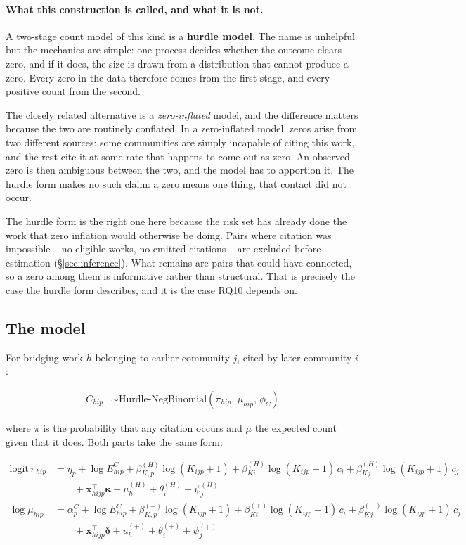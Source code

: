 \documentclass[11pt]{article}
\begin{document}
\paragraph{What this construction is called, and what it is not.} A two-stage count model of
this kind is a \textbf{hurdle model}. The name is unhelpful but the mechanics are simple: one
process decides whether the outcome clears zero, and if it does, the size is drawn from a
distribution that cannot produce a zero. Every zero in the data therefore comes from the
first stage, and every positive count from the second.

The closely related alternative is a \emph{zero-inflated} model, and the difference matters
because the two are routinely conflated. In a zero-inflated model, zeros arise from two
different sources: some communities are simply incapable of citing this work, and the rest
cite it at some rate that happens to come out as zero. An observed zero is then ambiguous
between the two, and the model has to apportion it. The hurdle form makes no such claim: a
zero means one thing, that contact did not occur.

The hurdle form is the right one here because the risk set has already done the work that
zero inflation would otherwise be doing. Pairs where citation was impossible -- no eligible
works, no emitted citations -- are excluded before estimation (\S\ref{sec:inference}). What
remains are pairs that could have connected, so a zero among them is informative rather than
structural. That is precisely the case the hurdle form describes, and it is the case RQ10
depends on.

\subsection{The model}

For bridging work $h$ belonging to earlier community $j$, cited by later community $i$:

\begin{align}
C_{hip} &\sim \mathrm{Hurdle\text{-}NegBinomial}\!\left(\pi_{hip},\, \mu_{hip},\, \phi_C\right)
\end{align}

where $\pi$ is the probability that any citation occurs and $\mu$ the expected count given
that it does. Both parts take the same form:

\begin{align}
\mathrm{logit}\,\pi_{hip} &= \eta_p + \log E^{C}_{hip}
  + \beta^{(H)}_{K,p}\log(K_{ijp}{+}1)
  + \beta^{(H)}_{Ki}\log(K_{ijp}{+}1)\,c_i
  + \beta^{(H)}_{Kj}\log(K_{ijp}{+}1)\,c_j \nonumber\\
  &\qquad + \boldsymbol{x}_{hijp}^{\top}\boldsymbol{\kappa}
  + u^{(H)}_{h} + \theta^{(H)}_{i} + \psi^{(H)}_{j}\\[4pt]
\log \mu_{hip} &= \alpha^{C}_p + \log E^{C}_{hip}
  + \beta^{(+)}_{K,p}\log(K_{ijp}{+}1)
  + \beta^{(+)}_{Ki}\log(K_{ijp}{+}1)\,c_i
  + \beta^{(+)}_{Kj}\log(K_{ijp}{+}1)\,c_j \nonumber\\
  &\qquad + \boldsymbol{x}_{hijp}^{\top}\boldsymbol{\delta}
  + u^{(+)}_{h} + \theta^{(+)}_{i} + \psi^{(+)}_{j}
\end{align}
\end{document}
